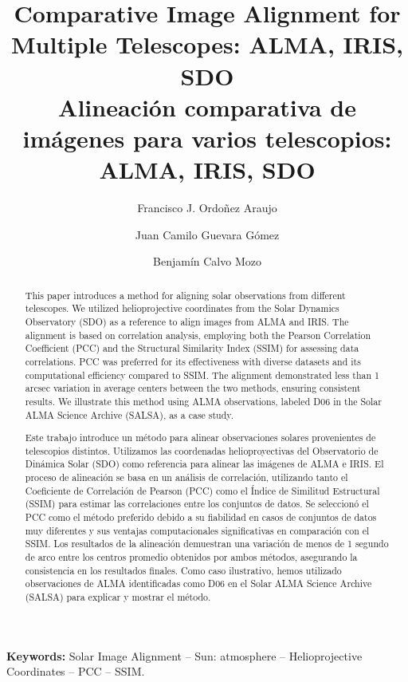 \documentclass[a4paper,alpha-refs]{eSpectra}
\title{Comparative Image Alignment for Multiple Telescopes: ALMA, IRIS, SDO
\\\vspace{3.5 mm}
\fontsize{12pt}{8pt} \selectfont\textcolor{jcolour!70}{ Alineación comparativa de imágenes para varios telescopios: ALMA, IRIS, SDO}}
\author[\orcid{0000-0002-7329-4877} 1,\authfn{1}]{Francisco J. Ordoñez Araujo}
\author[\orcid{0000-0001-6854-2779} 2,3,\authfn{1}]{Juan Camilo Guevara Gómez}
\author[\orcid{0000-0002-5041-1743} 1,\authfn{1}]{Benjamín Calvo Mozo}
\affil[1]{Observatorio Astronómico Nacional, Universidad Nacional de Colombia, Bogotá D.C., Colombia}
\affil[2]{Group Research \& Development DNV AS, Høvik, Norway}
\affil[3]{Rosseland Centre for Solar Physics, University of Oslo, Postboks 1029 Blindern, 0315 Oslo, Norway}
\begin{document}
\begin{frontmatter}
\maketitle






\begin{abstract}
\justifying
This paper introduces a method for aligning solar observations from different telescopes. We utilized helioprojective coordinates from the Solar Dynamics Observatory (SDO) as a reference to align images from ALMA and IRIS. The alignment is based on correlation analysis, employing both the Pearson Correlation Coefficient (PCC) and the Structural Similarity Index (SSIM) for assessing data correlations. PCC was preferred for its effectiveness with diverse datasets and its computational efficiency compared to SSIM. The alignment demonstrated less than 1 arcsec variation in average centers between the two methods, ensuring consistent results. We illustrate this method using ALMA observations, labeled D06 in the Solar ALMA Science Archive (SALSA), as a case study.


\end{abstract}



\qquad\quad\textbf{Keywords:} Solar Image Alignment -- Sun: atmosphere -- Helioprojective Coordinates -- PCC -- SSIM.



\begin{abstract}
\justifying
Este trabajo introduce un método para alinear observaciones solares provenientes de telescopios distintos. Utilizamos las coordenadas helioproyectivas del Observatorio de Dinámica Solar (SDO) como referencia para alinear las imágenes de ALMA e IRIS. El proceso de alineación se basa en un análisis de correlación, utilizando tanto el Coeficiente de Correlación de Pearson (PCC) como el Índice de Similitud Estructural (SSIM) para estimar las correlaciones entre los conjuntos de datos. Se seleccionó el PCC como el método preferido debido a su fiabilidad en casos de conjuntos de datos muy diferentes y sus ventajas computacionales significativas en comparación con el SSIM. Los resultados de la alineación demuestran una variación de menos de 1 segundo de arco entre los centros promedio obtenidos por ambos métodos, asegurando la consistencia en los resultados finales. Como caso ilustrativo, hemos utilizado observaciones de ALMA identificadas como D06 en el Solar ALMA Science Archive (SALSA) para explicar y mostrar el método.


\end{abstract}
\end{frontmatter}
\end{document}
